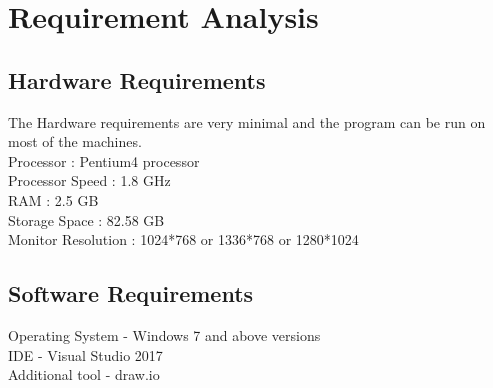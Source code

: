 \chapter{Requirement Analysis}

\section{Hardware Requirements}
The Hardware requirements are very minimal and the program can be run on most of
the machines. \\
Processor : Pentium4 processor\\
Processor Speed : 1.8 GHz\\
RAM : 2.5 GB\\
Storage Space : 82.58 GB\\
Monitor Resolution : 1024*768 or 1336*768 or 1280*1024\\
\thispagestyle{fancy}

\section{Software Requirements}
Operating System - Windows 7 and above versions\\
IDE - Visual Studio 2017\\
Additional tool - draw.io\\